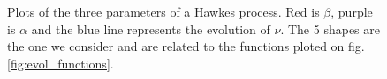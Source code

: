 \documentclass[11pt]{book}
\begin{document}
\begin{figure}
\centering
{}
\\
\\
\caption{Plots of the three parameters of a Hawkes process. Red is $\beta$, purple is $\alpha$ and the blue line represents the evolution of $\nu$. The 5 shapes are the one we consider and are related to the functions ploted on fig. \ref{fig:evol_functions}.}
\label{fig:evol_functions_interact}
\end{figure}
\end{document}
